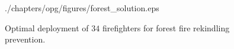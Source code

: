 \begin{figure}[ht]
	\vspace*{-2mm}
	\begin{center}
		\begin{overpic}[width=0.7\textwidth,tics=5]{./chapters/opg/figures/forest_solution.eps}
		\end{overpic}
	\end{center}
	\vspace*{-4.5mm}
	\caption{\label{fig:opg-forest}  Optimal deployment of $34$ firefighters for 
	forest fire rekindling prevention.}
	\vspace*{-3mm}
\end{figure}